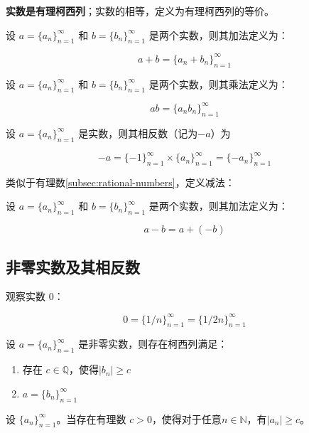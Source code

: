\begin{definition}[实数]
	\textbf{实数是有理柯西列}；实数的相等，定义为有理柯西列的等价。
\end{definition}

\begin{definition}[实数的加法]
	设 $a=\{a_n\}^\infty_{n=1}$ 和 $b=\{b_n\}^\infty_{n=1}$ 是两个实数，则其加法定义为：
	
	$$
	a+b = \{a_n+b_n\}^\infty_{n=1}
	$$
\end{definition}

\begin{definition}[实数的乘法]
	设 $a=\{a_n\}^\infty_{n=1}$ 和 $b=\{b_n\}^\infty_{n=1}$ 是两个实数，则其乘法定义为：
	
	$$
	ab = \{a_n b_n\}^\infty_{n=1}
	$$
\end{definition}

\begin{definition}[实数的相反数]
	设 $a = \{a_n\}^\infty_{n=1}$ 是实数，则其相反数（记为$-a$）为
	
	$$
	-a= \{-1\}^\infty_{n=1} \times \{a_n\}^\infty_{n=1} = \{-a_n\}^\infty_{n=1}
	$$
\end{definition}

类似于有理数\ref{subsec:rational-numbers}，定义减法：

\begin{definition}[实数的减法]
	设 $a=\{a_n\}^\infty_{n=1}$ 和 $b=\{b_n\}^\infty_{n=1}$ 是两个实数，则其加法定义为：
	
	$$
	a-b = a + (-b)
	$$
\end{definition}

\subsection{非零实数及其相反数}

\example 观察实数 $0$：

$$
0 = \{1/n\}_{n=1}^\infty = \{1/2n\}_{n=1}^\infty
$$


\begin{theorem}[实数表示的不唯一性]
	设 $a=\{a_n\}_{n=1}^\infty$ 是非零实数，则存在柯西列满足：
	\begin{enumerate}
		\item 存在 $c\in \mathbb Q$，使得$|b_n|\ge c$
		\item $a=\{b_n\}^\infty_{n=1}$
	\end{enumerate}
\end{theorem}

\begin{definition}[非退化柯西列]
	设 $\{a_n\}^\infty_{n=1}$。当存在有理数 $c > 0$，使得对于任意$n\in \mathbb N$，有$|a_n| \ge c$。
\end{definition}

